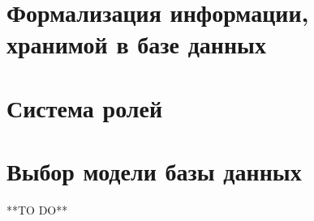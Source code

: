 \section{Формализация информации, хранимой в базе данных}
\section{Система ролей}
\section{Выбор модели базы данных}

**TO DO**
%
%
%
%
%
